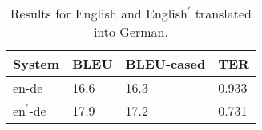 \begin{table}[!h]
\center 
{
	\begin{tabular}{|l|l|l|l|}
	\hline
	System        & BLEU  & BLEU-cased & TER   \\ \hline
	en-de & 16.6  & 16.3      & 0.933 \\ \hline
	en$^\prime$-de      & 17.9  & 17.2       & 0.731 \\ \hline
	\end{tabular}
}
\caption{Results for English and English$^\prime$ translated into German.}
\label{tab:ende}
\end{table}
